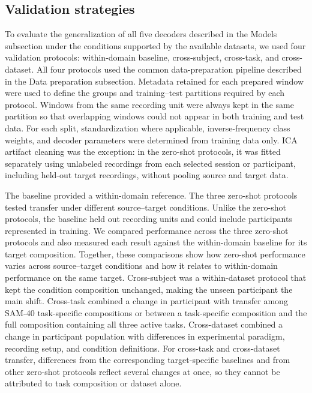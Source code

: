 \documentclass[10pt,letterpaper]{article}
\newcommand{\rev}[1]{#1}
\newcommand{\revs}[1]{#1}
\begin{document}

\FloatBarrier

\subsection*{\revs{Validation strategies}}

\rev{To evaluate the generalization of all five decoders described in the Models subsection under the conditions supported by the available datasets, we used four validation protocols: within-domain baseline, cross-subject, cross-task, and cross-dataset. All four protocols used the common data-preparation pipeline described in the Data preparation subsection. Metadata retained for each prepared window were used to define the groups and training--test partitions required by each protocol. Windows from the same recording unit were always kept in the same partition so that overlapping windows could not appear in both training and test data. For each split, standardization where applicable, inverse-frequency class weights, and decoder parameters were determined from training data only. ICA artifact cleaning was the exception: in the zero-shot protocols, it was fitted separately using unlabeled recordings from each selected session or participant, including held-out target recordings, without pooling source and target data.}

\rev{The baseline provided a within-domain reference. The three zero-shot protocols tested transfer under different source--target conditions. Unlike the zero-shot protocols, the baseline held out recording units and could include participants represented in training. We compared performance across the three zero-shot protocols and also measured each result against the within-domain baseline for its target composition. Together, these comparisons show how zero-shot performance varies across source--target conditions and how it relates to within-domain performance on the same target. Cross-subject was a within-dataset protocol that kept the condition composition unchanged, making the unseen participant the main shift. Cross-task combined a change in participant with transfer among SAM-40 task-specific compositions or between a task-specific composition and the full composition containing all three active tasks. Cross-dataset combined a change in participant population with differences in experimental paradigm, recording setup, and condition definitions. For cross-task and cross-dataset transfer, differences from the corresponding target-specific baselines and from other zero-shot protocols reflect several changes at once, so they cannot be attributed to task composition or dataset alone.}
\end{document}
